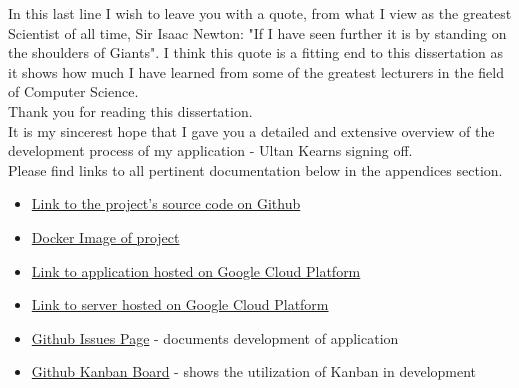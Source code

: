 In this last line I wish to leave you with a quote, from what I view as the greatest Scientist of all time, Sir Isaac Newton: "If I have seen further it is by standing on the shoulders of Giants"\cite{Newton}.  I think this quote is a fitting end to this dissertation as it shows how much I have learned from some of the greatest lecturers in the field of Computer Science.
\\
Thank you for reading this dissertation.
\\
It is my sincerest hope that I gave you a detailed and extensive overview of the development process of my application - Ultan Kearns signing off.
\\
Please find links to all pertinent documentation below in the appendices section.
\begin{appendices}
\begin{itemize}
\item \href{https://github.com/Ultan-Kearns/AppliedProject}{Link to the project's source code on Github}
\item \href{https://hub.docker.com/repository/docker/ultan/applied-project}{Docker Image of project}
\item \href{https://34.68.75.97:3000/}{Link to application hosted on Google Cloud Platform}
\item \href{https://34.68.75.97:8080/}{Link to server hosted on Google Cloud Platform}
\item \href{https://github.com/Ultan-Kearns/AppliedProject/issues}{Github Issues Page} - documents development of application
\item \href{https://github.com/Ultan-Kearns/AppliedProject/projects/3}{Github Kanban Board} - shows the utilization of Kanban in development
\end{itemize}
\end{appendices}




